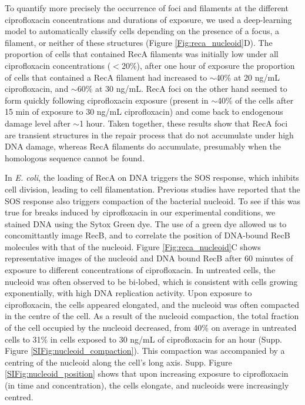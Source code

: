 To quantify more precisely the occurrence of foci and filaments at the different ciprofloxacin concentrations and durations of exposure, we used a deep-learning model to automatically classify cells depending on the presence of a focus, a filament, or neither of these structures (Figure \ref{Fig:reca_nucleoid}D). The proportion of cells that contained RecA filaments was initially low under all ciprofloxacin concentrations ($<$20\%), after one hour of exposure the proportion of cells that contained a RecA filament had increased to $\sim$40\% at 20 ng/mL ciprofloxacin, and $\sim$60\% at 30 ng/mL. RecA foci on the other hand seemed to form quickly following ciprofloxacin exposure (present in $\sim$40\% of the cells after 15 min of exposure to 30 ng/mL ciprofloxacin) and come back to endogenous damage level after $\sim$1 hour. Taken together, these results show that RecA foci are transient structures in the repair process that do not accumulate under high DNA damage, whereas RecA filaments do accumulate, presumably when the homologous sequence cannot be found.

In \emph{E. coli}, the loading of RecA on DNA triggers the SOS response, which inhibits cell division, leading to cell filamentation. Previous studies have reported that the SOS response also triggers compaction of the bacterial nucleoid.\cite{Odsbu2014} To see if this was true for breaks induced by ciprofloxacin in our experimental conditions, we stained DNA using the Sytox Green dye. The use of a green dye allowed us to concomittantly image RecB, and to correlate the position of DNA-bound RecB molecules with that of the nucleoid. Figure \ref{Fig:reca_nucleoid}C shows representative images of the nucleoid and DNA bound RecB after 60 minutes of exposure to different concentrations of ciprofloxacin. In untreated cells, the nucleoid was often observed to be bi-lobed, which is consistent with cells growing exponentially, with high DNA replication activity. Upon exposure to ciprofloxacin, the cells appeared elongated, and the nucleoid was often compacted in the centre of the cell. As a result of the nucleoid compaction, the total fraction of the cell occupied by the nucleoid decreased, from 40\% on average in untreated cells to 31\% in cells exposed to 30 ng/mL of ciprofloxacin for an hour (Supp. Figure \ref{SIFig:nucleoid_compaction}). This compaction was accompanied by a centring of the nucleoid along the cell's long axis. Supp. Figure \ref{SIFig:nucleoid_position} shows that upon increasing exposure to ciprofloxacin (in time and concentration), the cells elongate, and nucleoids were increasingly centred.

